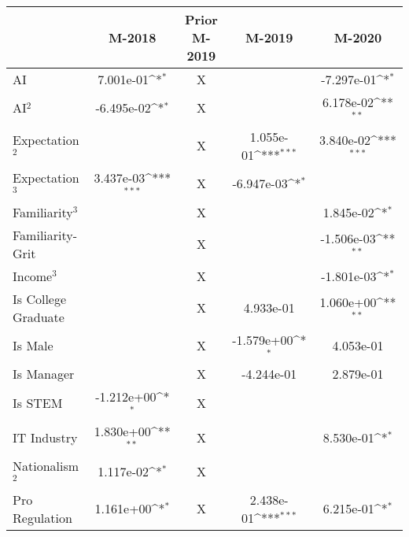 {
\def\sym#1{\ifmmode^{#1}\else\(^{#1}\)\fi}
\begin{tabular}{l*{4}{c}}
    \toprule
                              & M-2018             & Prior M-2019 & M-2019             & M-2020             \\
    \midrule
    AI                        & 7.001e-01\sym{*}   & X            &                    & -7.297e-01\sym{*}  \\
    \addlinespace
    AI$^2$                    & -6.495e-02\sym{*}  & X            &                    & 6.178e-02\sym{**}  \\
    \addlinespace
    Expectation$^2$           &                    & X            & 1.055e-01\sym{***} & 3.840e-02\sym{***} \\
    \addlinespace
    Expectation$^3$           & 3.437e-03\sym{***} & X            & -6.947e-03\sym{*}  &                    \\
    \addlinespace
    Familiarity$^3$           &                    & X            &                    & 1.845e-02\sym{*}   \\
    \addlinespace
    Familiarity-Grit          &                    & X            &                    & -1.506e-03\sym{**} \\
    \addlinespace
    Income$^3$                &                    & X            &                    & -1.801e-03\sym{*}  \\
    \addlinespace
    Is College Graduate       &                    & X            & 4.933e-01          & 1.060e+00\sym{**}  \\
    \addlinespace
    Is Male                   &                    & X            & -1.579e+00\sym{*}  & 4.053e-01          \\
    \addlinespace
    Is Manager                &                    & X            & -4.244e-01         & 2.879e-01          \\
    \addlinespace
    Is STEM                   & -1.212e+00\sym{*}  & X            &                    &                    \\
    \addlinespace
    IT Industry               & 1.830e+00\sym{**}  & X            &                    & 8.530e-01\sym{*}   \\
    \addlinespace
    Nationalism$^2$           & 1.117e-02\sym{*}   & X            &                    &                    \\
    \addlinespace
    Pro Regulation            & 1.161e+00\sym{*}   & X            & 2.438e-01\sym{***} & 6.215e-01\sym{*}   \\

\end{tabular}}
